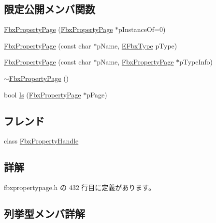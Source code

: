 \subsection*{限定公開メンバ関数}
\begin{DoxyCompactItemize}
\item 
\hyperlink{class_fbx_property_page_a68b9f893133e151f86c3c29a8fccf66d}{Fbx\+Property\+Page} (\hyperlink{class_fbx_property_page}{Fbx\+Property\+Page} $\ast$p\+Instance\+Of=0)
\item 
\hyperlink{class_fbx_property_page_ac6cee403bff8503088a7b425cc8cf02b}{Fbx\+Property\+Page} (const char $\ast$p\+Name, \hyperlink{fbxpropertytypes_8h_a73913a5ddfb20e57c6f25e9e6784bd92}{E\+Fbx\+Type} p\+Type)
\item 
\hyperlink{class_fbx_property_page_a8eea21b02443bbf63e2aa75f2ab1c753}{Fbx\+Property\+Page} (const char $\ast$p\+Name, \hyperlink{class_fbx_property_page}{Fbx\+Property\+Page} $\ast$p\+Type\+Info)
\item 
\hyperlink{class_fbx_property_page_a948765127c1ab18f2236023cc2255cf5}{$\sim$\+Fbx\+Property\+Page} ()
\item 
bool \hyperlink{class_fbx_property_page_a8bc4d86023cb4e9d067e2d99c9911e7f}{Is} (\hyperlink{class_fbx_property_page}{Fbx\+Property\+Page} $\ast$p\+Page)
\end{DoxyCompactItemize}
\subsection*{フレンド}
\begin{DoxyCompactItemize}
\item 
class \hyperlink{class_fbx_property_page_a22125c271a14844d33fa71927b100f2d}{Fbx\+Property\+Handle}
\end{DoxyCompactItemize}


\subsection{詳解}


 fbxpropertypage.\+h の 432 行目に定義があります。



\subsection{列挙型メンバ詳解}
\mbox{\label{class_fbx_property_page_a056448778e0c4902bf32c07188d79097}} 
